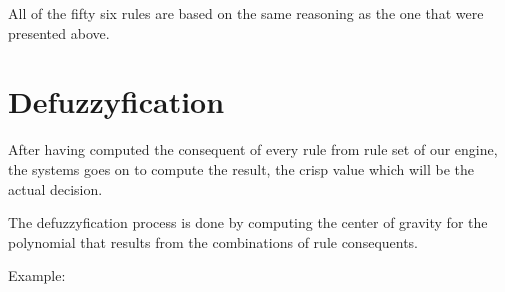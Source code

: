 \qquad All of the fifty six rules are based on the same reasoning as the one that were presented above.

\section{Defuzzyfication}

\qquad After having computed the consequent of every rule from rule set of our engine, the systems goes on
to compute the result, the crisp value which will be the actual decision.

\qquad The defuzzyfication process is done by computing the center of gravity for the polynomial that results
from the combinations of rule consequents.

\qquad Example:

